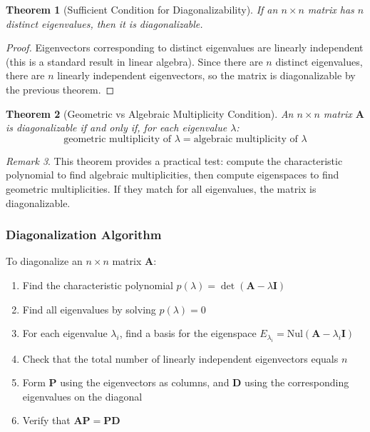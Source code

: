 \documentclass[12pt]{article}
\numberwithin{equation}{section}
\newcommand{\mat}[1]{\mathbf{#1}}        %
\theoremstyle{plain}
\newtheorem{theorem}{Theorem}[section]
\theoremstyle{definition}
\theoremstyle{remark}
\newtheorem{remark}[theorem]{Remark}
\begin{document}
\begin{theorem}[Sufficient Condition for Diagonalizability]
If an $n \times n$ matrix has $n$ distinct eigenvalues, then it is diagonalizable.
\end{theorem}

\begin{proof}
Eigenvectors corresponding to distinct eigenvalues are linearly independent (this is a standard result in linear algebra). Since there are $n$ distinct eigenvalues, there are $n$ linearly independent eigenvectors, so the matrix is diagonalizable by the previous theorem.
\end{proof}

\begin{theorem}[Geometric vs Algebraic Multiplicity Condition]
An $n \times n$ matrix $\mat{A}$ is diagonalizable if and only if, for each eigenvalue $\lambda$:
$$\text{geometric multiplicity of } \lambda = \text{algebraic multiplicity of } \lambda$$
\end{theorem}

\begin{remark}
This theorem provides a practical test: compute the characteristic polynomial to find algebraic multiplicities, then compute eigenspaces to find geometric multiplicities. If they match for all eigenvalues, the matrix is diagonalizable.
\end{remark}

\subsubsection{Diagonalization Algorithm}

\begin{algorithm}[H]
\caption{Diagonalizing a Matrix}
To diagonalize an $n \times n$ matrix $\mat{A}$:
\begin{enumerate}
\item Find the characteristic polynomial $p(\lambda) = \det(\mat{A} - \lambda\mat{I})$
\item Find all eigenvalues by solving $p(\lambda) = 0$
\item For each eigenvalue $\lambda_i$, find a basis for the eigenspace $E_{\lambda_i} = \text{Nul}(\mat{A} - \lambda_i\mat{I})$
\item Check that the total number of linearly independent eigenvectors equals $n$
\item Form $\mat{P}$ using the eigenvectors as columns, and $\mat{D}$ using the corresponding eigenvalues on the diagonal
\item Verify that $\mat{A}\mat{P} = \mat{P}\mat{D}$
\end{enumerate}
\end{algorithm}
\end{document}
